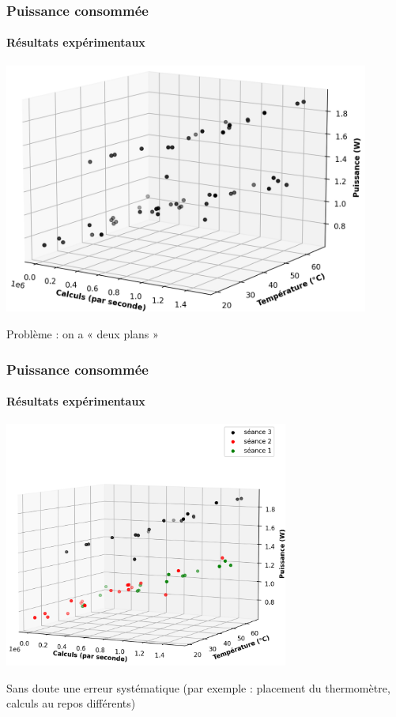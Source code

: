 \documentclass[a4paper,11pt]{beamer}
\begin{document}
\begin{frame}
    \frametitle{Puissance consommée}
    \framesubtitle{Résultats expérimentaux}

    \includegraphics[width=0.9\textwidth]{tous_les_points.png}

    Problème : on a « deux plans »
\end{frame}

\begin{frame}
    \frametitle{Puissance consommée}
    \framesubtitle{Résultats expérimentaux}

    \includegraphics[width=0.7\textwidth]{colorisee.png}

    Sans doute une erreur systématique (par exemple : placement du thermomètre, calculs au repos différents)
\end{frame}
\end{document}
